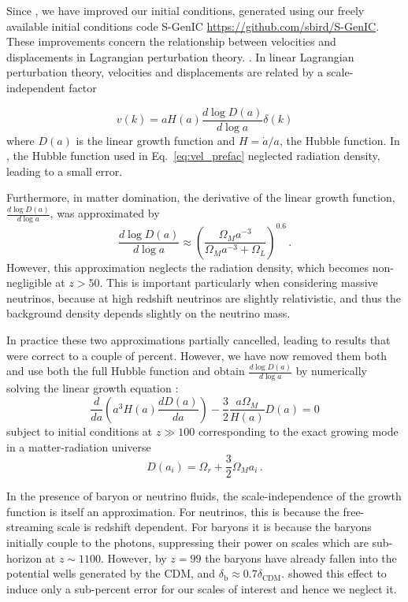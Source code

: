 \documentclass[useAMS, usenatbib]{mnras}
\begin{document}
Since \cite{AHB}, we have improved our initial conditions, generated 
using our freely available initial conditions code 
S-GenIC \url{https://github.com/sbird/S-GenIC}. These improvements concern
the relationship between velocities and displacements in Lagrangian perturbation theory.
\citep{Zeldovich:1969, Scoccimarro:1997}. In linear Lagrangian perturbation theory, 
velocities and displacements are related by a scale-independent factor

\begin{equation}
v(k) = a H(a) \frac{d \log D(a)}{d \log a} \delta(k) 
\label{eq:vel_prefac}
\end{equation}
where $D(a)$ is the linear growth function and $H = \dot{a}/a$, the Hubble function. 
In \cite{AHB}, the Hubble function used in Eq.~\ref{eq:vel_prefac} 
neglected radiation density, leading to a small error.

Furthermore, in matter domination, the derivative of the linear growth function, 
$\frac{d \log D(a)}{d \log a}$, was approximated by \citep{Bouchet:1969}
\begin{equation}
\frac{d \log D(a)}{d \log a} \approx \left(\frac{\Omega_M a^{-3}}{\Omega_M  a^{-3} + \Omega_L}\right)^{0.6}\,.
\end{equation}
However, this approximation neglects the radiation density, which becomes 
non-negligible at $z > 50$. This is important particularly when considering 
massive neutrinos, because at high redshift neutrinos are slightly relativistic, 
and thus the background density depends slightly on the neutrino mass.

In practice these two approximations partially cancelled, leading 
to results that were correct to a couple of percent. However, we 
have now removed them both and use both the full Hubble function 
and obtain $\frac{d \log D(a)}{d \log a}$ by numerically solving
the linear growth equation \citep{Peebles:1990}: 
\begin{equation}
\frac{d}{da}\left(a^3 H(a) \frac{d D(a)}{da}\right) - \frac{3}{2} \frac{a \Omega_M}{H(a)} D(a) = 0
\end{equation}
subject to initial conditions at $z \gg 100$ corresponding 
to the exact growing mode in a matter-radiation universe \citep{Groth:1975}
\begin{equation}
  D(a_i) = \Omega_r + \frac{3}{2} \Omega_M a_i\,.
\end{equation}

In the presence of baryon or neutrino fluids, the scale-independence 
of the growth function is itself an approximation. For neutrinos, this 
is because the free-streaming scale is redshift dependent. For baryons 
it is because the baryons initially couple to the photons, suppressing
their power on scales which are sub-horizon at $z \sim 1100$. However, 
by $z=99$ the baryons have already fallen into
the potential wells generated by the CDM, 
and $\delta_\mathrm{b} \approx 0.7 \delta_\mathrm{CDM}$.
\cite{Zennaro:2016} showed this effect to induce only 
a sub-percent error for our scales of interest and hence we neglect it.
\end{document}
